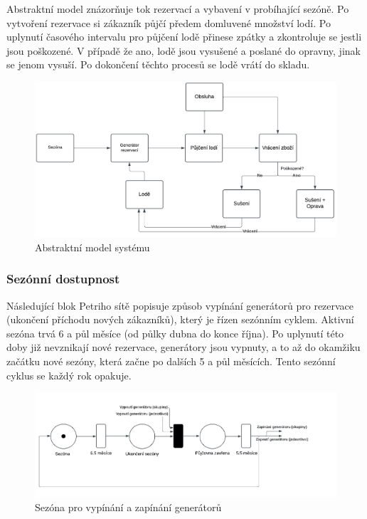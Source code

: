 \documentclass[a4paper, 12pt, hidelinks]{article}
\begin{document}
Abstraktní model znázorňuje tok rezervací a vybavení v probíhající sezóně. Po vytvoření rezervace si zákazník půjčí předem domluvené množství lodí. Po uplynutí časového intervalu pro půjčení lodě přinese zpátky a zkontroluje se jestli jsou poškozené. V případě že ano, lodě jsou vysušené a poslané do opravny, jinak se jenom vysuší. Po dokončení těchto procesů se lodě vrátí do skladu.

\begin{figure}[h]
    \centering
    \includegraphics[width=1.0\linewidth]{images/abstrakt.png}
    \caption{Abstraktní model systému}
    \label{fig:abstract}
\end{figure}

\subsubsection{Sezónní dostupnost}

Následující blok Petriho sítě popisuje způsob vypínání generátorů pro rezervace (ukončení příchodu nových zákazníků), který je řízen sezónním cyklem. Aktivní sezóna trvá 6 a půl měsíce (od půlky dubna do konce října). Po uplynutí této doby již nevznikají nové rezervace, generátory jsou vypnuty, a to až do okamžiku začátku nové sezóny, která začne po dalších 5 a půl měsících. Tento sezónní cyklus se každý rok opakuje.

\begin{figure}[h]
    \centering
    \includegraphics[width=0.85\linewidth]{images/sezona.png}
    \caption{Sezóna pro vypínání a zapínání generátorů}
    \label{fig:season}
\end{figure}
\end{document}
